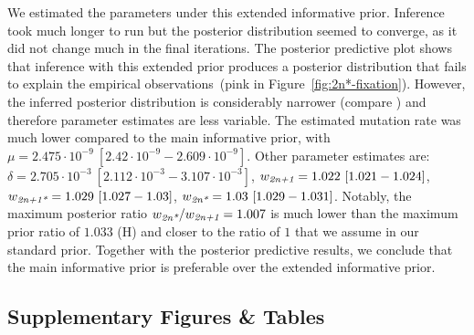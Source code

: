 \documentclass[12pt]{extarticle}
\newcommand{\anwt}{\emph{2n+1}}
\newcommand{\eumt}{\emph{2n*}}
\newcommand{\anmt}{\emph{2n+1*}}
\begin{document}
We estimated the parameters under this extended informative prior.
Inference took much longer to run but the posterior distribution seemed to converge, as it did not change much in the final iterations. 
The posterior predictive plot shows that inference with this extended prior produces a posterior distribution that fails to explain the empirical observations~(pink in Figure~\ref{fig:2n*-fixation}).
However, the inferred posterior distribution is considerably narrower (compare ) and therefore parameter estimates are less variable.
The estimated mutation rate was much lower compared to the main informative prior, with $\mu=2.475\cdot10^{-9}\ [2.42\cdot10^{-9}-2.609\cdot10^{-9}]$. Other parameter estimates are: $\delta=2.705\cdot10^{-3}\ [2.112\cdot10^{-3}-3.107\cdot10^{-3}]$,
$w_{\anwt}=1.022\ [1.021-1.024]$,
$w_{\anmt}=1.029\ [1.027-1.03]$,
$w_{\eumt}=1.03\ [1.029-1.031]$. 
Notably, the maximum posterior ratio $w_{\eumt}/w_{\anwt}=1.007$ is much lower than the maximum prior ratio of $1.033$ (H) and closer to the ratio of $1$ that we assume in our standard prior.
Together with the posterior predictive results, we conclude that the main informative prior is preferable over the extended informative prior.


\newpage
\subsection*{Supplementary Figures \& Tables}
\end{document}

